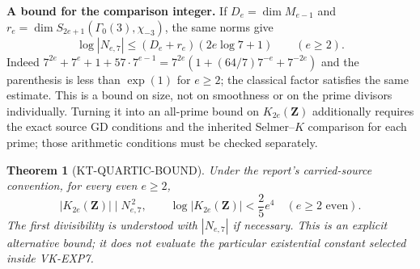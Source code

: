 \documentclass[11pt,a4paper]{article}
\newtheorem{theorem}{Theorem}[section]
\theoremstyle{definition}
\renewcommand{\paragraph}[1]{\par\smallskip\noindent\textbf{#1}\quad\ignorespaces}
\begin{document}
\paragraph{A bound for the comparison integer.}
If $D_e=\dim M_{e-1}$ and
$r_e=\dim S_{2e+1}(\Gamma_0(3),\chi_{-3})$, the same norms give
\[
 \log|N_{e,7}|\leq(D_e+r_e)(2e\log7+1)\qquad(e\geq2).
\]
Indeed
$7^{2e}+7^e+1+57\cdot7^{e-1}
 =7^{2e}(1+(64/7)7^{-e}+7^{-2e})$
and the parenthesis is less than $\exp(1)$ for $e\geq2$;
the classical factor satisfies the same estimate.
This is a bound on size, not on smoothness or on the prime
divisors individually. Turning it into an all-prime bound on
$K_{2e}(\mathbf Z)$ additionally requires the exact source
$\mathrm{GD}$ conditions and the inherited Selmer--$K$ comparison
for each prime; those arithmetic conditions must be checked
separately.

\begin{theorem}[KT-QUARTIC-BOUND]
Under the report's carried-source convention, for every even
$e\geq2$,
\[
      |K_{2e}(\mathbf Z)|\mid N_{e,7}^{\,2},\qquad
      \log|K_{2e}(\mathbf Z)|<\frac25 e^4
      \quad(e\geq2\text{ even}).                     \tag{KT-M.2}
\]
The first divisibility is understood with $|N_{e,7}|$ if necessary.
This is an explicit alternative bound; it does not evaluate the
particular existential constant selected inside VK-EXP7.
\end{theorem}
\end{document}
